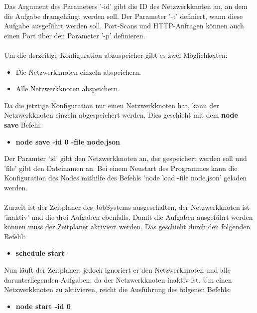 \documentclass[12pt,a4paper]{report}
\begin{document}
\begin{onehalfspace}
Das Argument des Parameters '-id' gibt die ID des Netzwerkknoten an, an dem die Aufgabe drangehängt werden soll. Der Parameter '-t' definiert, wann diese Aufgabe ausgeführt werden soll. Port-Scans und HTTP-Anfragen können auch einen Port über den Parameter '-p' definieren.\\\\

Um die derzeitige Konfiguration abzuspeicher gibt es zwei Möglichkeiten:

\begin{itemize}
\item Die Netzwerkknoten einzeln abspeichern.
\item Alle Netzwerkknoten abspeichern.
\end{itemize}

Da die jetztige Konfiguration nur einen Netzwerkknoten hat, kann der Netzwerkknoten einzeln abgespeichert werden. Dies geschieht mit dem \textbf{node save} Befehl:\\

\begin{itemize}
\item \textbf{node save -id 0 -file node.json}
\end{itemize}

Der Paramter 'id' gibt den Netzwerkknoten an, der gespeichert werden soll und 'file' gibt den Dateinamen an. Bei einem Neustart des Programmes kann die Konfiguration des Nodes mithilfe des Befehls 'node load -file node.json' geladen werden.\\\\
Zurzeit ist der Zeitplaner des JobSystems ausgeschalten, der Netzwerkknoten ist 'inaktiv' und die drei Aufgaben ebenfalls. Damit die Aufgaben ausgeführt werden können muss der Zeitplaner aktiviert werden. Das geschieht durch den folgenden Befehl:\\

\begin{itemize}
\item \textbf{schedule start}
\end{itemize}

Nun läuft der Zeitplaner, jedoch ignoriert er den Netzwerkknoten und alle darunterliegenden Aufgaben, da der Netzwerkknoten inaktiv ist. Um einen Netzwerkknoten zu aktivieren, reicht die Ausführung des folgenen Befehls:\\

\begin{itemize}
\item \textbf{node start -id 0}
\end{itemize}


\end{onehalfspace}
\end{document}
